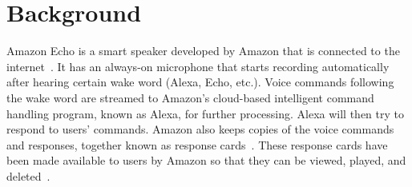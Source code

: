 \section{Background}
Amazon Echo is a smart speaker developed by Amazon that is connected to the internet~\cite{wikipedia_2019}. It has an always-on microphone that starts recording automatically after hearing certain wake word (Alexa, Echo, etc.). Voice commands following the wake word are streamed to Amazon's cloud-based intelligent command handling program, known as Alexa, for further processing. Alexa will then try to respond to users' commands. Amazon also keeps copies of the voice commands and responses, together known as response cards~\cite{ford2019alexa}. These response cards have been made available to users by Amazon so that they can be viewed, played, and deleted~\cite{amazon_2010}.